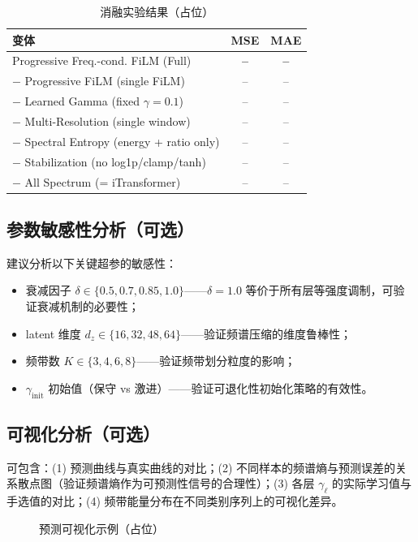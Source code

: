 \begin{table}[t]
  \centering
  \caption{消融实验结果（占位）}
  \label{tab:ablation}
  \begin{tabular}{lcc}
    \toprule
    变体 & MSE & MAE \\
    \midrule
    Progressive Freq.-cond. FiLM (Full) & \textbf{--} & \textbf{--} \\
    $-$ Progressive FiLM (single FiLM) & -- & -- \\
    $-$ Learned Gamma (fixed \(\gamma = 0.1\)) & -- & -- \\
    $-$ Multi-Resolution (single window) & -- & -- \\
    $-$ Spectral Entropy (energy + ratio only) & -- & -- \\
    $-$ Stabilization (no log1p/clamp/tanh) & -- & -- \\
    $-$ All Spectrum (= iTransformer) & -- & -- \\
    \bottomrule
  \end{tabular}
\end{table}

\subsection{参数敏感性分析（可选）}
建议分析以下关键超参的敏感性：
\begin{itemize}
  \item 衰减因子 \(\delta \in \{0.5, 0.7, 0.85, 1.0\}\)——\(\delta = 1.0\) 等价于所有层等强度调制，可验证衰减机制的必要性；
  \item latent 维度 \(d_z \in \{16, 32, 48, 64\}\)——验证频谱压缩的维度鲁棒性；
  \item 频带数 \(K \in \{3, 4, 6, 8\}\)——验证频带划分粒度的影响；
  \item \(\gamma_{\text{init}}\) 初始值（保守 vs 激进）——验证可退化性初始化策略的有效性。
\end{itemize}

\subsection{可视化分析（可选）}
可包含：(1) 预测曲线与真实曲线的对比；(2) 不同样本的频谱熵与预测误差的关系散点图（验证频谱熵作为可预测性信号的合理性）；(3) 各层 \(\gamma_{\ell}\) 的实际学习值与手选值的对比；(4) 频带能量分布在不同类别序列上的可视化差异。

\begin{figure}[t]
  \centering
  \caption{预测可视化示例（占位）}
  \label{fig:vis}
\end{figure}
